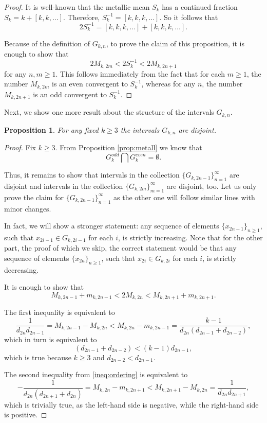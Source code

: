 \documentclass{amsart}
\newtheorem{proposition}[theorem]{Proposition}
\theoremstyle{definition}
\newcommand{\0}{\mbf 0}%
\begin{document}
\begin{proof}
    It is well-known that the metallic mean $S_k$ has a continued fraction 
    $S_k = k+[k,k,\ldots].$ Therefore, $S_k^{-1}= [k,k,k,\ldots].$ So it follows that 
$$
2S_k^{-1} = [k,k,k,\ldots] +[k,k,k,\ldots].
$$

Because of the definition of $G_{k,n}$, to prove the claim of this proposition, it is enough to show that 
$$
2M_{k,2m} < 2S_k^{-1} < 2M_{k,2n+1}
$$
for any $n,m\geq1$. This follows immediately from the fact that for each $m\geq1$, the number $M_{k,2m}$ is an even convergent to $S_k^{-1}$, whereas for any $n$, the number $M_{k,2n+1}$ is an odd convergent to $S_k^{-1}$.
\end{proof}
Next, we show one more result about the structure of the intervals $G_{k,n}$.
\begin{proposition}\label{prop:disjoint}
  For any fixed $k\geq3$ the intervals $G_{k,n}$ are disjoint.
\end{proposition}

\begin{proof}
Fix $k\geq3$. From Proposition \ref{prop:metall} we know that 
$$
G_k^{odd} \bigcap G_k^{even} = \emptyset.
$$

Thus, it remains to show that intervals in the collection $\{ G_{k,2n-1}\}_{n=1}^\infty$ are disjoint and intervals in the collection $\{ G_{k,2m}\}_{m=1}^\infty$ are disjoint, too. Let us only prove the claim for $\{ G_{k,2n-1}\}_{n=1}^\infty$ as the other one will follow similar lines with minor changes.

In fact, we will show a stronger statement: any sequence of elements $\{x_{2n-1}\}_{n\geq1}$, such that $x_{2i-1}\in G_{k,2i-1}$ for each $i$, is strictly increasing. Note that for the other part, the proof of which we skip, the correct statement would be that any sequence of elements $\{x_{2n}\}_{n\geq1}$, such that $x_{2i}\in G_{k,2i}$ for each $i$, is strictly decreasing.



It is enough to show that 
\begin{equation}\label{ineq:ordering}
M_{k,2n-1} +m_{k,2n-1}< 2M_{k,2n}< M_{k,2n+1}+m_{k,2n+1}.
\end{equation}


The first inequality is equivalent to 
$$
\frac{1}{d_{2n}d_{2n-1}}=M_{k,2n-1} -M_{k,2n} < M_{k,2n} -m_{k,2n-1}  = \frac{k-1}{d_{2n}(d_{2n-1}+d_{2n-2})},
$$
which in turn is equivalent to
$$
(d_{2n-1}+d_{2n-2})< (k-1)d_{2n-1},
$$
which is true because $k\geq3$ and $d_{2n-2}<d_{2n-1}$.

The second inequality from \eqref{ineq:ordering} is equivalent to
$$
-\frac{1}{d_{2n}(d_{2n+1}+d_{2n})} =M_{k,2n} -m_{k,2n+1} < M_{k,2n+1} -M_{k,2n} = \frac{1}{d_{2n}d_{2n+1}},
$$
which is trivially true, as the left-hand side is negative, while the right-hand side is positive.
\end{proof}
\end{document}
